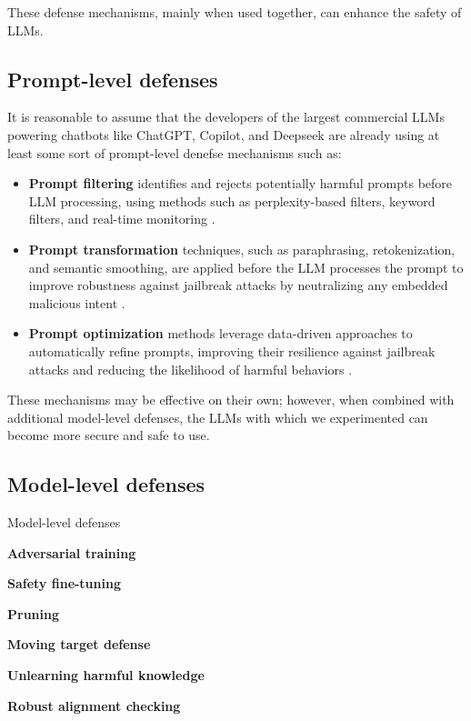 These defense mechanisms, mainly when used together, can enhance the safety of LLMs.

\subsection{Prompt-level defenses}

It is reasonable to assume that the developers of the largest commercial LLMs powering chatbots like ChatGPT, Copilot, and Deepseek are already using at least some sort of prompt-level denefse mechanisms such as:

\begin{itemize}
    \item \textbf{Prompt filtering} identifies and rejects potentially harmful prompts before LLM processing, using methods such as perplexity-based filters, keyword filters, and real-time monitoring \cite{peng2025jailbreakingmitigationvulnerabilitieslarge}.
    \item \textbf{Prompt transformation} techniques, such as paraphrasing, retokenization, and semantic smoothing, are applied before the LLM processes the prompt to improve robustness against jailbreak attacks by neutralizing any embedded malicious intent \cite{peng2025jailbreakingmitigationvulnerabilitieslarge}.
    \item \textbf{Prompt optimization} methods leverage data-driven approaches to automatically refine prompts, improving their resilience against jailbreak attacks and reducing the likelihood of harmful behaviors \cite{peng2025jailbreakingmitigationvulnerabilitieslarge}.
\end{itemize}

These mechanisms may be effective on their own; however, when combined with additional model-level defenses, the LLMs with which we experimented can become more secure and safe to use.

\subsection{Model-level defenses}

Model-level defenses 

\textbf{Adversarial training}

\textbf{Safety fine-tuning}

\textbf{Pruning}

\textbf{Moving target defense}

\textbf{Unlearning harmful knowledge}

\textbf{Robust alignment checking}

